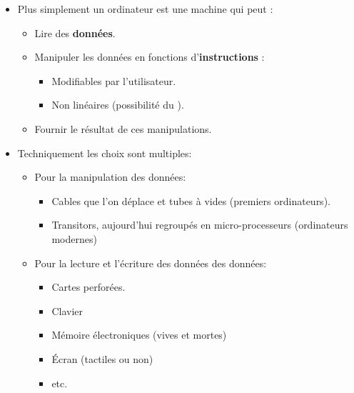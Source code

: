 \documentclass{beamer}
\begin{document}
\begin{slide}
	\begin{itemize}
		\item Plus simplement un ordinateur est une machine qui peut :
			\begin{itemize}
				\item Lire des \textbf{données}. 
				\item Manipuler les données en fonctions d'\textbf{instructions} :
					\begin{itemize}
						\item Modifiables par l'utilisateur.
						\item Non linéaires (possibilité du ).
					\end{itemize}
				\item Fournir le résultat de ces manipulations. 
			\end{itemize}
		\item Techniquement les choix sont multiples:
			\begin{itemize}
				\item Pour la manipulation des données:
					\begin{itemize}
						\item Cables que l'on déplace et tubes à vides (premiers ordinateurs).
						\item Transitors, aujourd'hui regroupés en micro-processeurs (ordinateurs modernes)
						\
					\end{itemize}
				\item Pour la lecture et l'écriture des données des données:
					\begin{itemize}
						\item Cartes perforées.
						\item Clavier
						\item Mémoire électroniques (vives et mortes)
						\item Écran (tactiles ou non)
						\item etc.
					\end{itemize}
			\end{itemize}
	\end{itemize}
\end{slide}
\end{document}
